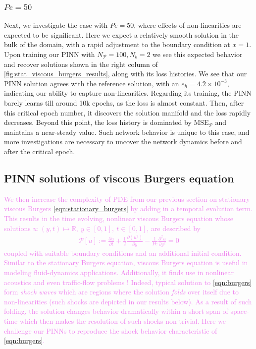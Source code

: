 \documentclass[11pt]{article}
\newcommand{\mse}{\textrm{MSE}}
\newcommand{\pde}{\ensuremath{\mathcal{P}}}
\newcommand{\newcontent}[1]{\textcolor{violet}{#1}}
\begin{document}
\subsubsection{\(Pe = 50\)}
\label{sec:orgbbe7ced}
Next, we investigate the case with \(Pe = 50\), where effects of
non-linearities are expected to be significant. Here we expect a relatively
smooth solution in the bulk of the domain, with a rapid adjustment to the boundary
condition at \(x = 1\). Upon training our PINN with \(N_\pde = 100 , N_b = 2\) we
see this expected behavior and recover solutions shown in the right column of
\cref{fig:stat_viscous_burgers_results}, along with its loss histories.
We see that our PINN solution agrees with the reference solution,
with an \(e_h = 4.2 \times 10^{-3}\), indicating our ability to capture
non-linearities. Regarding its training, the PINN barely learns till around 10k epochs,
as the loss is almost constant. Then, after this
critical epoch number, it discovers
the solution manifold and the loss rapidly decreases. Beyond this
point, the loss history is dominated by \(\mse_\pde\) and maintains a near-steady value. Such network behavior is unique to this case, and
more investigations are necessary to uncover the network dynamics before and
after the critical epoch.

\subsection{PINN solutions of viscous Burgers equation}
\label{sec:burgers}
\newcontent{
We then increase the complexity of PDE from our previous section on
stationary viscous Burgers \cref{eqn:stationary_burgers} by adding in a temporal
evolution term. This results in the time evolving, nonlinear viscous Burgers
equation whose solutions \(u : (y, t) \mapsto \mathbb{R},~y \in [0, 1],~t \in [0, 1]\),
are described by
\begin{equation}
\label{eqn:burgers}
\begin{aligned}
	 \pde[ u ] := \frac{\partial u}{\partial t} + \frac{1}{2}\frac{\partial \left(u^2\right)}{\partial y} - \frac{1}{Pe}\frac{\partial^2 u}{\partial y^2} = 0
\end{aligned}
\end{equation}
coupled with suitable boundary conditions and an additional initial condition. Similar to the stationary Burgers
equation, viscous Burgers equation is useful in modeling fluid-dynamics applications.
Additionally, it finds use in nonlinear acoustics and even traffic-flow
problems \cite{miroe2017}! Indeed, typical solution to \cref{eqn:burgers} form
\emph{shock waves} which are regions where the solution \emph{folds} over itself due to
non-linearities (such shocks are depicted in our results below). As a result
of such folding, the
solution changes behavior dramatically within a short span of space-time
which then makes the resolution of such shocks non-trivial. Here we challenge
our PINNs to reproduce the shock behavior characteristic of \cref{eqn:burgers}.
}
\end{document}
